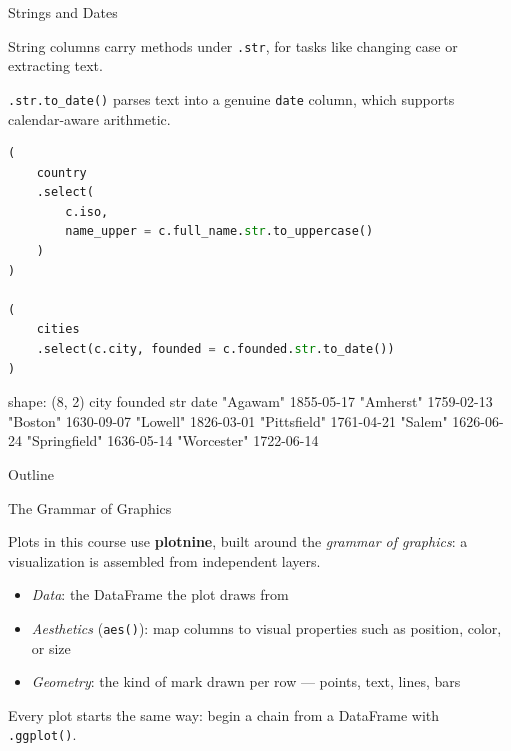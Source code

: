\documentclass[8pt,aspectratio=169]{beamer}
\begin{document}
\begin{frame}[fragile]{Strings and Dates}
\begin{splitcode}{%

String columns carry methods under \texttt{.str}, for tasks like changing case or extracting text.

\texttt{.str.to\_date()} parses text into a genuine \texttt{date} column, which supports calendar-aware arithmetic.

}
\begin{lstlisting}[language=Python]
(
    country
    .select(
        c.iso,
        name_upper = c.full_name.str.to_uppercase()
    )
)

(
    cities
    .select(c.city, founded = c.founded.str.to_date())
)
\end{lstlisting}
\begin{codeoutput}
shape: (8, 2)
city           founded
str            date
"Agawam"       1855-05-17
"Amherst"      1759-02-13
"Boston"       1630-09-07
"Lowell"       1826-03-01
"Pittsfield"   1761-04-21
"Salem"        1626-06-24
"Springfield"  1636-05-14
"Worcester"    1722-06-14
\end{codeoutput}
\end{splitcode}
\end{frame}

\begin{outlineframe}{Outline}
\end{outlineframe}

\begin{textframe}{The Grammar of Graphics}

Plots in this course use \textbf{plotnine}, built around the \textit{grammar of graphics}: a visualization is assembled from independent layers.

\begin{itemize}
\item \textit{Data}: the DataFrame the plot draws from
\item \textit{Aesthetics} (\texttt{aes()}): map columns to visual properties such as position, color, or size
\item \textit{Geometry}: the kind of mark drawn per row --- points, text, lines, bars
\end{itemize}

Every plot starts the same way: begin a chain from a DataFrame with \texttt{.ggplot()}.

\end{textframe}
\end{document}
